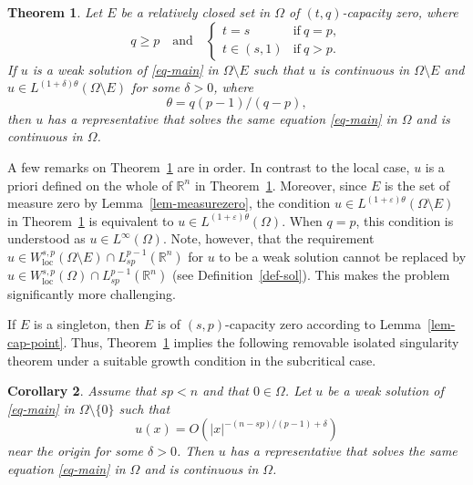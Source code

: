\documentclass[11pt]{amsart}
\theoremstyle{plain}
\newtheorem{theorem}{Theorem}[section]
\newtheorem{corollary}[theorem]{Corollary}
\theoremstyle{definition}
\numberwithin{equation}{section}
\begin{document}
	\begin{theorem}\label{thm-rem}
		Let $E$ be a relatively closed set in $\Omega$ of $(t, q)$-capacity zero, where
		\begin{equation*}
			q\geq p \quad\text{and}\quad
			\begin{cases}
				t=s &\text{if}~q=p, \\
				t \in (s, 1) &\text{if}~q>p.
			\end{cases}
		\end{equation*}
		If $u$ is a weak solution of \eqref{eq-main} in $\Omega \setminus E$ such that $u$ is continuous in $\Omega \setminus E$ and $u \in L^{(1+\delta)\theta}(\Omega \setminus E)$ for some $\delta>0$, where
		\begin{equation*}
			\theta=q(p-1)/(q-p),
		\end{equation*}
		then $u$ has a representative that solves the same equation \eqref{eq-main} in $\Omega$ and is continuous in $\Omega$.
	\end{theorem}
	A few remarks on Theorem~\ref{thm-rem} are in order. In contrast to the local case, $u$ is a priori defined on the whole of $\mathbb{R}^n$ in Theorem~\ref{thm-rem}. Moreover, since $E$ is the set of measure zero by Lemma~\ref{lem-measurezero}, the condition $u \in L^{(1+\varepsilon)\theta}(\Omega \setminus E)$ in Theorem~\ref{thm-rem} is equivalent to $u \in L^{(1+\varepsilon)\theta}(\Omega)$. When $q=p$, this condition is understood as $u \in L^\infty(\Omega)$. Note, however, that the requirement $u \in W^{s, p}_{\mathrm{loc}}(\Omega\setminus E)\cap L^{p-1}_{sp}(\mathbb{R}^n)$ for $u$ to be a weak solution cannot be replaced by $u \in W^{s, p}_{\mathrm{loc}}(\Omega)\cap L^{p-1}_{sp}(\mathbb{R}^n)$ (see Definition~\ref{def-sol}). This makes the problem significantly more challenging.

	
	If $E$ is a singleton, then $E$ is of $(s, p)$-capacity zero according to Lemma~\ref{lem-cap-point}. Thus, Theorem~\ref{thm-rem} implies the following removable isolated singularity theorem under a suitable growth condition in the subcritical case.
	
	\begin{corollary}\label{cor-rem}
		Assume that $sp<n$ and that $0 \in \Omega$. Let $u$ be a weak solution of \eqref{eq-main} in $\Omega \setminus \{0\}$ such that
		\begin{equation*}
			u(x)=O\left(|x|^{-(n-sp)/(p-1)+\delta} \right)
		\end{equation*}
		near the origin for some $\delta>0$. Then $u$ has a representative that solves the same equation \eqref{eq-main} in $\Omega$ and is continuous in $\Omega$.
	\end{corollary}
\end{document}
